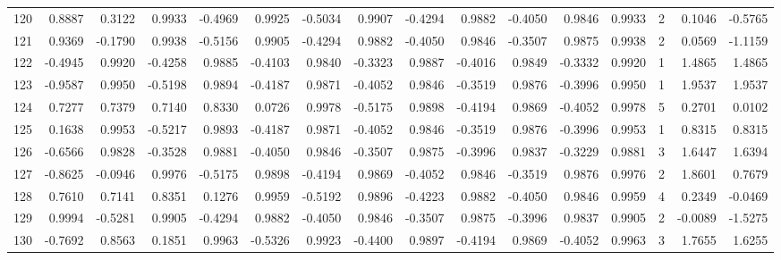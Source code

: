 \begin{tabular}{lrrrrrrrrrrrrrrr}
120 &      0.8887 &  0.3122 &  0.9933 & -0.4969 &  0.9925 & -0.5034 &  0.9907 & -0.4294 &  0.9882 & -0.4050 &   0.9846 &     0.9933 &      2 &                    0.1046 &                    -0.5765 \\
121 &      0.9369 & -0.1790 &  0.9938 & -0.5156 &  0.9905 & -0.4294 &  0.9882 & -0.4050 &  0.9846 & -0.3507 &   0.9875 &     0.9938 &      2 &                    0.0569 &                    -1.1159 \\
122 &     -0.4945 &  0.9920 & -0.4258 &  0.9885 & -0.4103 &  0.9840 & -0.3323 &  0.9887 & -0.4016 &  0.9849 &  -0.3332 &     0.9920 &      1 &                    1.4865 &                     1.4865 \\
123 &     -0.9587 &  0.9950 & -0.5198 &  0.9894 & -0.4187 &  0.9871 & -0.4052 &  0.9846 & -0.3519 &  0.9876 &  -0.3996 &     0.9950 &      1 &                    1.9537 &                     1.9537 \\
124 &      0.7277 &  0.7379 &  0.7140 &  0.8330 &  0.0726 &  0.9978 & -0.5175 &  0.9898 & -0.4194 &  0.9869 &  -0.4052 &     0.9978 &      5 &                    0.2701 &                     0.0102 \\
125 &      0.1638 &  0.9953 & -0.5217 &  0.9893 & -0.4187 &  0.9871 & -0.4052 &  0.9846 & -0.3519 &  0.9876 &  -0.3996 &     0.9953 &      1 &                    0.8315 &                     0.8315 \\
126 &     -0.6566 &  0.9828 & -0.3528 &  0.9881 & -0.4050 &  0.9846 & -0.3507 &  0.9875 & -0.3996 &  0.9837 &  -0.3229 &     0.9881 &      3 &                    1.6447 &                     1.6394 \\
127 &     -0.8625 & -0.0946 &  0.9976 & -0.5175 &  0.9898 & -0.4194 &  0.9869 & -0.4052 &  0.9846 & -0.3519 &   0.9876 &     0.9976 &      2 &                    1.8601 &                     0.7679 \\
128 &      0.7610 &  0.7141 &  0.8351 &  0.1276 &  0.9959 & -0.5192 &  0.9896 & -0.4223 &  0.9882 & -0.4050 &   0.9846 &     0.9959 &      4 &                    0.2349 &                    -0.0469 \\
129 &      0.9994 & -0.5281 &  0.9905 & -0.4294 &  0.9882 & -0.4050 &  0.9846 & -0.3507 &  0.9875 & -0.3996 &   0.9837 &     0.9905 &      2 &                   -0.0089 &                    -1.5275 \\
130 &     -0.7692 &  0.8563 &  0.1851 &  0.9963 & -0.5326 &  0.9923 & -0.4400 &  0.9897 & -0.4194 &  0.9869 &  -0.4052 &     0.9963 &      3 &                    1.7655 &                     1.6255 \\

\end{tabular}
